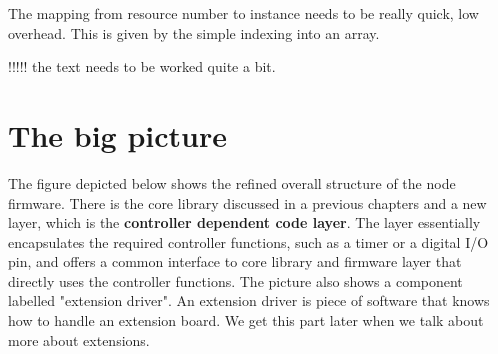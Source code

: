 The mapping from resource number to instance needs to be really quick, low overhead. This is given by the simple indexing into an array.


!!!!! the text needs to be worked quite a bit.


\section{The big picture}

The figure depicted below shows the refined overall structure of the node firmware. There is the core library discussed in a previous chapters and a new layer, which is the \textbf{controller dependent code layer}. The layer essentially encapsulates the required controller functions, such as a timer or a digital I/O pin, and offers a common interface to core library and firmware layer that directly uses the controller functions. The picture also shows a component labelled "extension driver". An extension driver is piece of software that knows how to handle an extension board. We get this part later when we talk about more about extensions.

